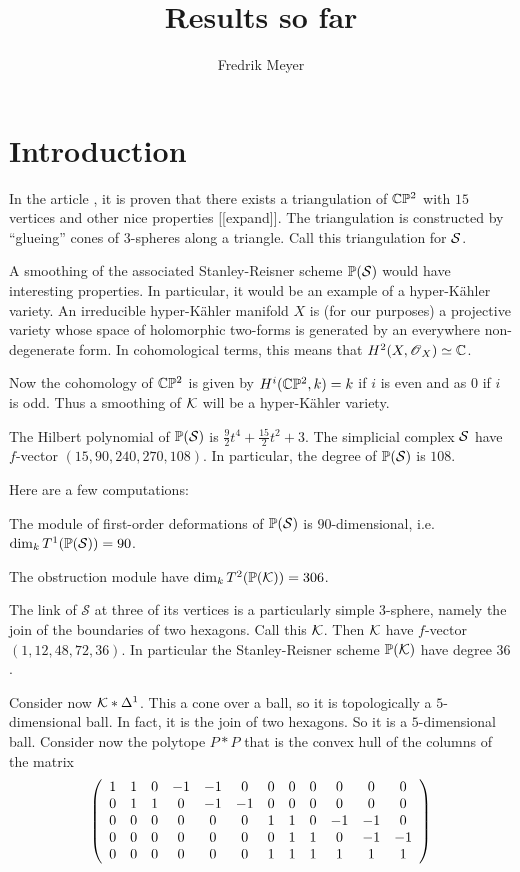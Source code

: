 \documentclass[11pt, english]{article}
\begin{document}
\title{Results so far}
\author{Fredrik Meyer}
\maketitle 

\section{Introduction}

In the article \cite{gaifullin_triangulation}, it is proven that there exists a triangulation of $\C \PP^2$ with $15$ vertices and other nice properties [[expand]]. The triangulation is constructed by ``glueing'' cones of $3$-spheres along a triangle.  Call this triangulation for $\S$.

A smoothing of the associated Stanley-Reisner scheme $\PP(\S)$ would have interesting properties. In particular, it would be an example of a hyper-Kähler variety. An irreducible hyper-Kähler manifold $X$ is (for our purposes) a projective variety whose space of holomorphic two-forms is generated by an everywhere non-degenerate form. In cohomological terms, this means that $H^2(X,\OO_X) \simeq \C$.

Now the cohomology of $\C \PP^2$ is given by $H^i(\C \PP^2, k)=k$ if $i$ is even and as $0$ if $i$ is odd. Thus a smoothing of $\K$ will be a hyper-Kähler variety.

The Hilbert polynomial of $\PP(\S)$ is $\frac 92 t^{4}+\frac{15}2 t^{2}+3$. The simplicial complex $\S$ have $f$-vector $(15,90,240,270,108)$. In particular, the degree of $\PP(\S)$ is $108$.

Here are a few computations:
\begin{lemma}
The module of first-order deformations of $\PP(\S)$ is $90$-dimensional, i.e. $\dim_k T^1(\PP(\S)) = 90$.
\end{lemma}
\begin{lemma}
The obstruction module have $\dim_k T^2(\PP(\K))=306$.
\end{lemma}

The link of $\mathcal S$ at three of its vertices is a particularly simple $3$-sphere, namely the join of the boundaries of two hexagons. Call this $\K$. Then $\K$ have $f$-vector $(1, 12, 48, 72, 36)$. In particular the Stanley-Reisner scheme $\PP(\K)$ have degree $36$.

Consider now $\K \ast \Delta^1$. This a cone over a ball, so it is topologically a $5$-dimensional ball. In fact, it is the join of two hexagons. So it is a $5$-dimensional ball. Consider now the polytope $P \ast P$ that is the convex hull of the columns of the matrix
\[
\left(
\begin{array}{*{12}c}
 1 & 1 & 0 & -1 & -1& 0 & 0 & 0 & 0 & 0 & 0 & 0 \\
 0 & 1 & 1 & 0 & -1 & -1& 0 & 0 & 0  & 0 & 0 & 0 \\
 0 & 0 & 0 & 0 & 0 & 0 & 1 & 1 & 0  & -1 & -1 & 0 \\
 0 & 0 & 0 & 0 & 0 & 0 & 0 & 1 & 1  & 0 & -1 & -1 \\
 0 & 0 & 0 & 0 & 0 & 0 & 1 & 1 & 1  & 1 & 1 & 1 \\
\end{array}
\right) \]
\end{document}
